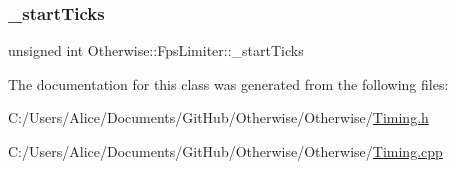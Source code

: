 \subsubsection{\texorpdfstring{\+\_\+start\+Ticks}{\_startTicks}}
{\footnotesize\ttfamily unsigned int Otherwise\+::\+Fps\+Limiter\+::\+\_\+start\+Ticks\hspace{0.3cm}{\ttfamily [private]}}



The documentation for this class was generated from the following files\+:\begin{DoxyCompactItemize}
\item 
C\+:/\+Users/\+Alice/\+Documents/\+Git\+Hub/\+Otherwise/\+Otherwise/\hyperlink{_timing_8h}{Timing.\+h}\item 
C\+:/\+Users/\+Alice/\+Documents/\+Git\+Hub/\+Otherwise/\+Otherwise/\hyperlink{_timing_8cpp}{Timing.\+cpp}\end{DoxyCompactItemize}
